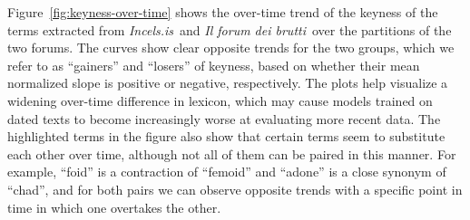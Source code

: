 \documentclass[11pt]{article}
\newcommand{\enforum}{\textit{Incels.is}}
\newcommand{\itforum}{\textit{Il forum dei brutti}}
\begin{document}


Figure~\ref{fig:keyness-over-time} shows the over-time trend of the keyness of the terms extracted from \enforum\, and \itforum\, over the partitions of the two forums. The curves show clear opposite trends for the two groups, which we refer to as ``gainers'' and ``losers'' of keyness, based on whether their mean normalized slope is positive or negative, respectively. The plots help visualize a widening over-time difference in lexicon, which may cause models trained on dated texts to become increasingly worse at evaluating more recent data. The highlighted terms in the figure also show that certain terms seem to substitute each other over time, although not all of them can be paired in this manner. For example, ``foid'' is a contraction of ``femoid'' and ``adone'' is a close synonym of ``chad'', and for both pairs we can observe opposite trends with a specific point in time in which one overtakes the other.
\end{document}

